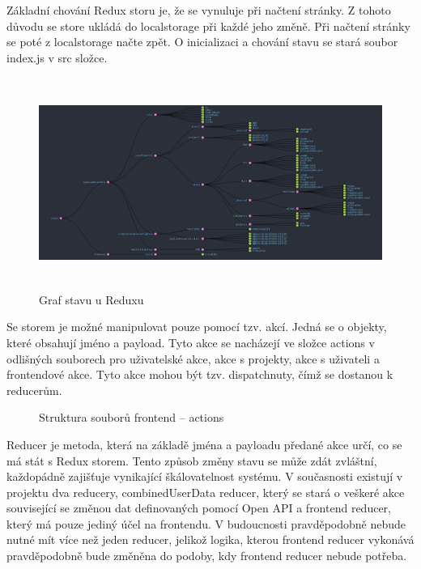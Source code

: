 \documentclass[a4paper,oneside,12pt]{report}
\begin{document}
Základní chování Redux storu je, že se vynuluje při načtení stránky.
Z tohoto důvodu se store ukládá do localstorage při každé jeho změně.
Při načtení stránky se poté z localstorage načte zpět.
O inicializaci a chování stavu se stará soubor index.js v src složce.

\begin{figure}[h]
	\centering
	\includegraphics[height=6.9cm]{../img/Redux.png}
	\caption[Graf stavu u reduxu, vlastní tvorba, vygenerováno pomocí redux dev tools ]{Graf stavu u Reduxu}
	\label{fig:redux}
\end{figure}


Se storem je možné manipulovat pouze pomocí tzv. akcí.
Jedná se o objekty, které obsahují jméno a payload.
Tyto akce se nacházejí ve složce actions v odlišných souborech pro uživatelské akce, akce s projekty, akce s uživateli a frontendové akce.
Tyto akce mohou být tzv. dispatchnuty, čímž se dostanou k reducerům.

\begin{figure}[h]
	\caption[Struktura souborů frontendu -- actions, vlastní tvorba]{Struktura souborů frontend -- actions}
	\label{fig:frontendStructureSrc}
\end{figure}


Reducer je metoda, která na základě jména a payloadu předané akce určí, co se má stát s Redux storem.
Tento způsob změny stavu se může zdát zvláštní, každopádně zajišťuje vynikající škálovatelnost systému.
V současnosti existují v projektu dva reducery, combinedUserData reducer, který se stará o veškeré akce související se změnou dat definovaných pomocí Open API a frontend reducer, který má pouze jediný účel na frontendu.
V budoucnosti pravděpodobně nebude nutné mít více než jeden reducer, jelikož logika, kterou frontend reducer vykonává pravděpodobně bude změněna do podoby, kdy frontend reducer nebude potřeba.
\end{document}
